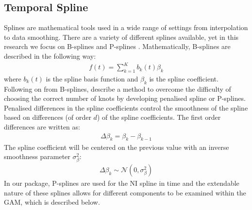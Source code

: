 \subsection{Temporal Spline}\label{temporalspline}
Splines are mathematical tools used in a wide range of settings from interpolation to data smoothing. There are a variety of different splines available, yet in this research we focus on B-splines \citep{deBoor1978, Dierckx1995} and P-splines \citep{eilers_1996}. Mathematically, B-splines are described in the following way:
\begin{align}
    f(t) = \sum^K_{k=1} b_k(t) \beta_k 
\end{align}
where \(b_k(t)\) is the spline basis function and \(\beta_k\) is the spline coefficient.
Following on from B-splines, \citet{eilers_1996} describe a method to overcome the difficulty of choosing the correct number of knots by developing penalised spline or P-splines. Penalised differences in the spline coefficients control the smoothness of the spline based on differences (of order \(d\)) of the spline coefficients. The first order differences are written as:
\begin{align}
\Delta\beta_k = \beta_k - \beta_{k-1}
\end{align}
The spline coefficient will be centered on the previous value with an inverse smoothness parameter \(\sigma^2_{\beta}\):
\begin{align}
\Delta \beta_k \sim \mathcal{N}(0, \sigma_{\beta}^2)
\end{align}
In our package, P-splines are used for the NI spline in time and the extendable nature of these splines allows for different components to be examined within the GAM, which is described below.
